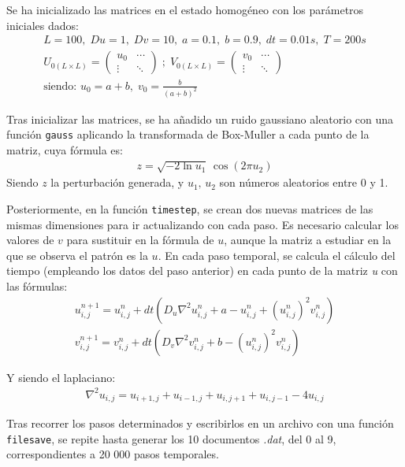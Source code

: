 \documentclass[12pt]{article}
\newcommand{\code}[1]{\colorbox{mygray}{\lstinline|#1|}}
\begin{document}
Se ha inicializado las matrices en el estado homogéneo con los parámetros iniciales dados:
\begin{gather*}
	L=100,\; Du=1,\; Dv=10,\; a=0.1,\; b=0.9,\; dt=0.01s,\; T=200s\\
	U_{0(L\times L)}=\left(
	\begin{array}{cc}
		u_0 & \cdots\\
		\vdots & \ddots
	\end{array}
	\right) \; ; \;
	V_{0(L\times L)} = \left(
	\begin{array}{cc}
		v_0 & \cdots\\
		\vdots & \ddots
	\end{array}
	\right)\\
	\text{siendo: } u_0=a+b ,\; v_0=\frac{b}{(a+b)^2}
\end{gather*}

 Tras inicializar las matrices, se ha añadido un ruido gaussiano aleatorio con una función \code{gauss} aplicando la transformada de Box-Muller a cada punto de la matriz, cuya fórmula es:
\begin{gather*}
	z = \sqrt{-2\ln u_1}\, \cos(2\pi u_2)
\end{gather*}
Siendo $z$ la perturbación generada, y $u_1,\, u_2$ son números aleatorios entre 0 y 1.

Posteriormente, en la función \code{timestep}, se crean dos nuevas matrices de las mismas dimensiones para ir actualizando con cada paso. Es necesario calcular los valores de $v$ para sustituir en la fórmula de $u$, aunque la matriz a estudiar en la que se observa el patrón es la $u$. En cada paso temporal, se calcula el cálculo del tiempo (empleando los datos del paso anterior) en cada punto de la matriz \textit{u} con las fórmulas:
\begin{gather*}
	u_{i,j}^{n+1} = u_{i,j}^n + dt \left( D_u \nabla^2 u_{i,j}^n + a - u_{i,j}^n + (u_{i,j}^n)^2 v_{i,j}^n \right) \\
	v_{i,j}^{n+1} = v_{i,j}^n + dt \left( D_v \nabla^2 v_{i,j}^n + b - (u_{i,j}^n)^2 v_{i,j}^n \right)
\end{gather*}

Y siendo el laplaciano:
\begin{gather*}
	\nabla^2 u_{i,j} = u_{i+1,j}+u_{i-1,j}+u_{i,j+1}+u_{i,j-1}-4u_{i,j}
\end{gather*}

Tras recorrer los pasos determinados y escribirlos en un archivo con una función \code{filesave}, se repite hasta generar los 10 documentos \textit{.dat}, del 0 al 9, correspondientes a 20 000 pasos temporales.
\end{document}
